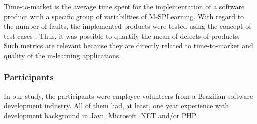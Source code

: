 \begin{table}
%
\end{table}

Time-to-market is the average time spent for the implementation of a software product with a specific group of variabilities of M-SPLear\allowbreak ning. With regard to the number of faults, the implemented products were tested using the concept of test cases \cite{craig02}. Thus, it was possible to quantify the mean of defects of products. Such metrics are relevant because they are directly related to time-to-market and quality of the m-learning applications.

\subsubsection{Participants}

In our study, the participants were employee volunteers from a Brazilian software development industry. All of them had, at least, one year experience with development background in Java, Microsoft .NET and/or PHP.

